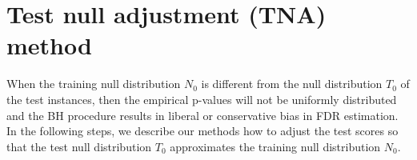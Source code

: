 \documentclass{article}
\begin{document}
%
%
%
%
%
%    
%    
%    
%    
%
%    

\section{Test null adjustment (TNA) method}
When the training null distribution $N_0$ is different from the null distribution $T_0$ of the test instances, then the empirical p-values will not be uniformly distributed and the BH procedure results in liberal or conservative bias in FDR estimation. In the following steps, we describe our methods how to adjust the test scores so that the test null distribution $T_0$ approximates the training null distribution $N_0$.
\end{document}
